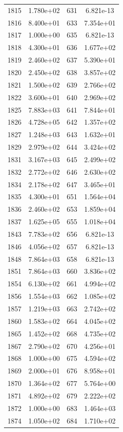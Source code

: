 \documentclass[12pt]{article}
\begin{document}
\begin{longtable}{@{}cccc@{}}
1815 & 1.780e+02 & 631 & 6.821e-13 \\
1816 & 8.400e+01 & 633 & 7.354e+01 \\
1817 & 1.000e+00 & 635 & 6.821e-13 \\
1818 & 4.300e+01 & 636 & 1.677e+02 \\
1819 & 2.460e+02 & 637 & 5.390e+01 \\
1820 & 2.450e+02 & 638 & 3.857e+02 \\
1821 & 1.500e+02 & 639 & 2.766e+02 \\
1822 & 3.600e+01 & 640 & 2.969e+02 \\
1825 & 7.883e+03 & 641 & 7.844e+01 \\
1826 & 4.728e+05 & 642 & 1.357e+02 \\
1827 & 1.248e+03 & 643 & 1.632e+01 \\
1829 & 2.979e+02 & 644 & 3.424e+02 \\
1831 & 3.167e+03 & 645 & 2.499e+02 \\
1832 & 2.772e+02 & 646 & 2.630e+02 \\
1834 & 2.178e+02 & 647 & 3.465e+01 \\
1835 & 4.300e+01 & 651 & 1.564e+04 \\
1836 & 2.460e+02 & 653 & 1.859e+04 \\
1837 & 1.625e+05 & 655 & 1.018e+04 \\
1843 & 7.783e+02 & 656 & 6.821e-13 \\
1846 & 4.056e+02 & 657 & 6.821e-13 \\
1848 & 7.864e+03 & 658 & 6.821e-13 \\
1851 & 7.864e+03 & 660 & 3.836e+02 \\
1854 & 6.130e+02 & 661 & 4.994e+02 \\
1856 & 1.554e+03 & 662 & 1.085e+02 \\
1857 & 1.219e+03 & 663 & 2.742e+02 \\
1860 & 1.583e+02 & 664 & 4.045e+02 \\
1865 & 1.452e+02 & 668 & 4.735e+02 \\
1867 & 2.790e+02 & 670 & 4.256e+01 \\
1868 & 1.000e+00 & 675 & 4.594e+02 \\
1869 & 2.000e+01 & 676 & 8.958e+01 \\
1870 & 1.364e+02 & 677 & 5.764e+00 \\
1871 & 4.892e+02 & 679 & 2.222e+02 \\
1872 & 1.000e+00 & 683 & 1.464e+03 \\
1874 & 1.050e+02 & 684 & 1.710e+02 \\

\end{longtable}
\end{document}
